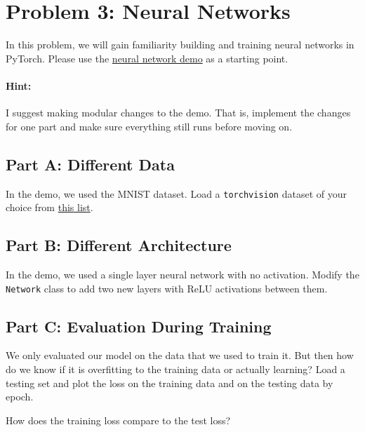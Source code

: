 \documentclass{article}
\begin{document}
%

\newpage
\section*{Problem 3: Neural Networks}

In this problem, we will gain familiarity building and training neural networks in PyTorch.
Please use the \href{https://colab.research.google.com/drive/1E3aJCFD5OI076r86OElgHMOy9iW6WfYv?usp=sharing}{neural network demo} as a starting point.

\paragraph{Hint:} I suggest making modular changes to the demo. That is, implement the changes for one part and make sure everything still runs before moving on.

\subsection*{Part A: Different Data}

In the demo, we used the MNIST dataset. Load a \texttt{torchvision} dataset of your choice from \href{https://pytorch.org/vision/main/datasets.html}{this list}.

\subsection*{Part B: Different Architecture}

In the demo, we used a single layer neural network with no activation. Modify the \texttt{Network} class to add two new layers with ReLU activations between them.

\subsection*{Part C: Evaluation During Training}

We only evaluated our model on the data that we used to train it. But then how do we know if it is overfitting to the training data or actually learning?
Load a testing set and plot the loss on the training data and on the testing data by epoch.

How does the training loss compare to the test loss?

%
\end{document}
